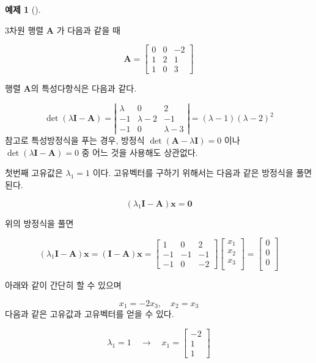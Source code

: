 \documentclass[
  11pt,
  a4paper,
  oneside]{scrbook}
\theoremstyle{definition}
\theoremstyle{definition}
\newtheorem{exercise}{예제}[chapter]
\theoremstyle{plain}
\theoremstyle{remark}
\begin{document}
\begin{exercise}[]\protect\hypertarget{exr-Example-20-1}{}\label{exr-Example-20-1}

3차원 행렬 \(\pmb A\) 가 다음과 같을 때

\[\pmb A=\left[\begin{array}{ccc}0 & 0 & -2 \\ 1 & 2 & 1 \\ 1 & 0 & 3\end{array}\right]\]

행렬 \(\pmb A\)의 특성다항식은 다음과 같다.

\[
\operatorname{det}(\lambda \pmb I -\pmb A)= 
\left|\begin{array}{ccc}
\lambda & 0 & 2 \\
-1 & \lambda-2 & -1 \\
-1 & 0 & \lambda-3
\end{array}\right|=(\lambda-1)(\lambda-2)^2
\] 참고로 특성방정식을 푸는 경우, 방정식
\(\operatorname{det}(\pmb A - \lambda \pmb I)=0\) 이나
\(\operatorname{det}(\lambda \pmb I -\pmb A)= 0\) 중 어느 것을 사용해도
상관없다.

첫번째 고유값은 \(\lambda_1=1\) 이다. 고유벡터를 구하기 위해서는 다음과
같은 방정식을 풀면 된다.

\[ (\lambda_1 \pmb I -\pmb A )\pmb x = \pmb 0  \]

위의 방정식을 풀면

\[
(\lambda_1 \pmb I -\pmb A )\pmb x= (\pmb I -\pmb A )\pmb x
=
\begin{bmatrix}
1 & 0 & 2 \\
-1 & -1 & -1 \\
-1 & 0 & -2
\end{bmatrix}
\begin{bmatrix}
x_1 \\
x_2 \\
x_3 \\
\end{bmatrix}
=
\begin{bmatrix}
0 \\
0 \\
0 \\
\end{bmatrix}
\]

아래와 같이 간단히 할 수 있으며

\[ x_1 = -2x_3, \quad x_2 = x_3 \] 다음과 같은 고유값과 고유벡터를 얻을
수 있다.

\[ \lambda_1=1 \quad \rightarrow \quad  x_1=\begin{bmatrix}-2 \\ 1 \\ 1\end{bmatrix} \]


\end{exercise}
\end{document}
